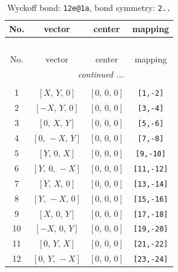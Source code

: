 \documentclass[fleqn,8pt]{jsarticle}
\begin{document}
\begin{longtable}{cccc}
\caption{Wyckoff bond: {\tt 12e@1a}, bond symmetry: {\tt 2..}}
 \\
 \hline \hline
No. & vector & center & mapping \\ \hline \endfirsthead

\multicolumn{3}{l}{\tablename\ \thetable{}} \\
 \hline \hline
No. & vector & center & mapping \\ \hline \endhead

 \hline \hline
\multicolumn{3}{r}{\footnotesize\it continued ...} \\ \endfoot

 \hline \hline
\multicolumn{3}{r}{} \\ \endlastfoot

1 & $\left[ X,\, Y,\, 0 \right]$ & $\left[ 0,\, 0,\, 0 \right]$ & {\tt [1,-2]} \\ \hline
2 & $\left[ - X,\, Y,\, 0 \right]$ & $\left[ 0,\, 0,\, 0 \right]$ & {\tt [3,-4]} \\ \hline
3 & $\left[ 0,\, X,\, Y \right]$ & $\left[ 0,\, 0,\, 0 \right]$ & {\tt [5,-6]} \\ \hline
4 & $\left[ 0,\, - X,\, Y \right]$ & $\left[ 0,\, 0,\, 0 \right]$ & {\tt [7,-8]} \\ \hline
5 & $\left[ Y,\, 0,\, X \right]$ & $\left[ 0,\, 0,\, 0 \right]$ & {\tt [9,-10]} \\ \hline
6 & $\left[ Y,\, 0,\, - X \right]$ & $\left[ 0,\, 0,\, 0 \right]$ & {\tt [11,-12]} \\ \hline
7 & $\left[ Y,\, X,\, 0 \right]$ & $\left[ 0,\, 0,\, 0 \right]$ & {\tt [13,-14]} \\ \hline
8 & $\left[ Y,\, - X,\, 0 \right]$ & $\left[ 0,\, 0,\, 0 \right]$ & {\tt [15,-16]} \\ \hline
9 & $\left[ X,\, 0,\, Y \right]$ & $\left[ 0,\, 0,\, 0 \right]$ & {\tt [17,-18]} \\ \hline
10 & $\left[ - X,\, 0,\, Y \right]$ & $\left[ 0,\, 0,\, 0 \right]$ & {\tt [19,-20]} \\ \hline
11 & $\left[ 0,\, Y,\, X \right]$ & $\left[ 0,\, 0,\, 0 \right]$ & {\tt [21,-22]} \\ \hline
12 & $\left[ 0,\, Y,\, - X \right]$ & $\left[ 0,\, 0,\, 0 \right]$ & {\tt [23,-24]} \\
\end{longtable}
\renewcommand{\arraystretch}{1.2}
\end{document}
